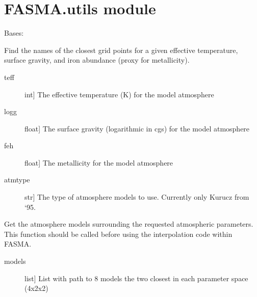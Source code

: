 \documentclass[letterpaper,10pt,english]{sphinxmanual}
\begin{document}
\section{FASMA.utils module}
\label{\detokenize{index:module-FASMA.utils}}\label{\detokenize{index:fasma-utils-module}}

\begin{fulllineitems}
\label{\detokenize{index:FASMA.utils.GetModels}}
Bases: 

Find the names of the closest grid points for a given effective
temperature, surface gravity, and iron abundance (proxy for metallicity).
\begin{description}
\item[{teff}] \leavevmode{[}int{]}
The effective temperature (K) for the model atmosphere

\item[{logg}] \leavevmode{[}float{]}
The surface gravity (logarithmic in cgs) for the model atmosphere

\item[{feh}] \leavevmode{[}float{]}
The metallicity for the model atmosphere

\item[{atmtype}] \leavevmode{[}str{]}
The type of atmosphere models to use. Currently only Kurucz from ‘95.

\end{description}

\begin{fulllineitems}
\label{\detokenize{index:FASMA.utils.GetModels.getmodels}}
Get the atmosphere models surrounding the requested atmospheric
parameters. This function should be called before using the interpolation
code within FASMA.
\begin{description}
\item[{models}] \leavevmode{[}list{]}
List with path to 8 models the two closest in each parameter space (4x2x2)


\end{description}
\end{fulllineitems}
\end{fulllineitems}
\end{document}

